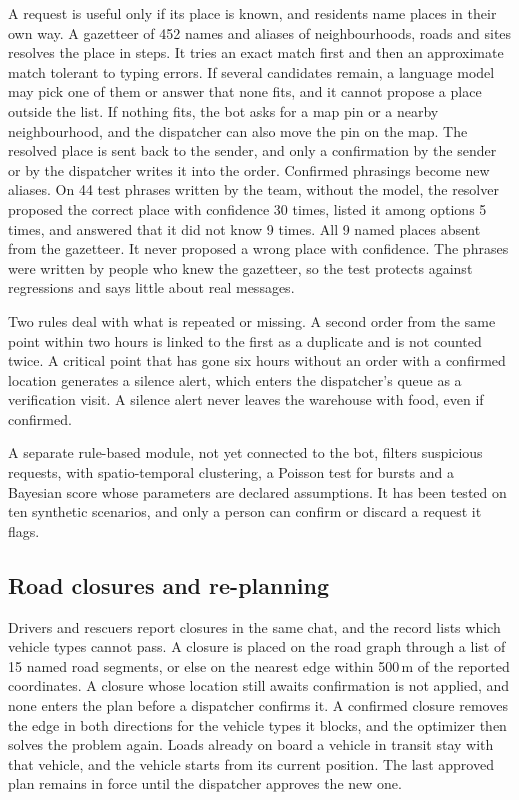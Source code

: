 \documentclass[11pt]{article}
\begin{document}
A request is useful only if its place is known, and residents name places in their own way. A gazetteer of 452 names and aliases of neighbourhoods, roads and sites resolves the place in steps. It tries an exact match first and then an approximate match tolerant to typing errors. If several candidates remain, a language model may pick one of them or answer that none fits, and it cannot propose a place outside the list. If nothing fits, the bot asks for a map pin or a nearby neighbourhood, and the dispatcher can also move the pin on the map. The resolved place is sent back to the sender, and only a confirmation by the sender or by the dispatcher writes it into the order. Confirmed phrasings become new aliases. On 44 test phrases written by the team, without the model, the resolver proposed the correct place with confidence 30 times, listed it among options 5 times, and answered that it did not know 9 times. All 9 named places absent from the gazetteer. It never proposed a wrong place with confidence. The phrases were written by people who knew the gazetteer, so the test protects against regressions and says little about real messages.

Two rules deal with what is repeated or missing. A second order from the same point within two hours is linked to the first as a duplicate and is not counted twice. A critical point that has gone six hours without an order with a confirmed location generates a silence alert, which enters the dispatcher's queue as a verification visit. A silence alert never leaves the warehouse with food, even if confirmed.

A separate rule-based module, not yet connected to the bot, filters suspicious requests, with spatio-temporal clustering, a Poisson test for bursts and a Bayesian score whose parameters are declared assumptions. It has been tested on ten synthetic scenarios, and only a person can confirm or discard a request it flags.

\subsection{Road closures and re-planning}

Drivers and rescuers report closures in the same chat, and the record lists which vehicle types cannot pass. A closure is placed on the road graph through a list of 15 named road segments, or else on the nearest edge within 500\,m of the reported coordinates. A closure whose location still awaits confirmation is not applied, and none enters the plan before a dispatcher confirms it. A confirmed closure removes the edge in both directions for the vehicle types it blocks, and the optimizer then solves the problem again. Loads already on board a vehicle in transit stay with that vehicle, and the vehicle starts from its current position. The last approved plan remains in force until the dispatcher approves the new one.
\end{document}
